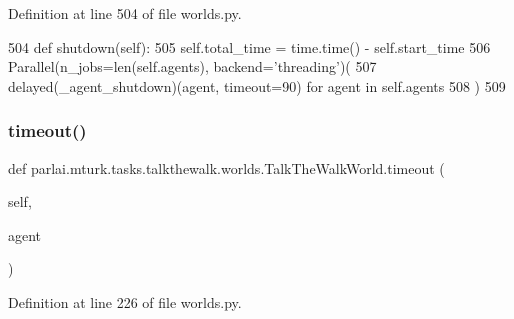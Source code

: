 Definition at line 504 of file worlds.\+py.


\begin{DoxyCode}
504     \textcolor{keyword}{def }shutdown(self):
505         self.total\_time = time.time() - self.start\_time
506         Parallel(n\_jobs=len(self.agents), backend=\textcolor{stringliteral}{'threading'})(
507             delayed(\_agent\_shutdown)(agent, timeout=90) \textcolor{keywordflow}{for} agent \textcolor{keywordflow}{in} self.agents
508         )
509 
\end{DoxyCode}
\mbox{\label{classparlai_1_1mturk_1_1tasks_1_1talkthewalk_1_1worlds_1_1TalkTheWalkWorld_afd6fc4ead1a01da85a024a633e2232e3}} 
\subsubsection{\texorpdfstring{timeout()}{timeout()}}
{\footnotesize\ttfamily def parlai.\+mturk.\+tasks.\+talkthewalk.\+worlds.\+Talk\+The\+Walk\+World.\+timeout (\begin{DoxyParamCaption}\item[{}]{self,  }\item[{}]{agent }\end{DoxyParamCaption})}



Definition at line 226 of file worlds.\+py.


